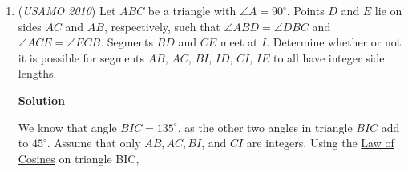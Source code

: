 \begin{enumerate}
 
 \begin{align*} A_{\omega,1}^2   &=     \frac{21}{10} \cdot \lim_{n \to \infty}       \prod_{k=2}^{n-1} 	\frac{(k+\frac{3}{4})(k-\frac{1}{2})(k-\frac{1}{4})} 	     {(k-\frac{3}{4})(k+\frac{1}{2})(k+\frac{1}{4})} \\   &=     \frac{21}{10} \cdot \lim_{n \to \infty}       \left(       \frac{\Gamma(\frac{5}{4})  \Gamma(\frac{5}{2})  \Gamma(\frac{9}{4})} 	   {\Gamma(\frac{11}{4}) \Gamma(\frac{3}{2})  \Gamma(\frac{7}{4})}\cdot       \frac{\Gamma(n+\frac{3}{4})\Gamma(n-\frac{1}{2})\Gamma(n-\frac{1}{4})} 	   {\Gamma(n-\frac{3}{4})\Gamma(n+\frac{1}{2})\Gamma(n+\frac{1}{4})}       \right) \\   &=     \frac{1}{4} \cdot \frac{\Gamma^2(\frac{1}{4})}{\Gamma^2(\frac{3}{4})} \cdot       \lim_{n \to \infty} 	\frac{\Gamma(n+\frac{3}{4})\Gamma(n-\frac{1}{2})\Gamma(n-\frac{1}{4})} 	     {\Gamma(n-\frac{3}{4})\Gamma(n+\frac{1}{2})\Gamma(n+\frac{1}{4})} \\   &= \frac{1}{4} \cdot \frac{\Gamma^2(\frac{1}{4})}{\Gamma^2(\frac{3}{4})}      \cdot 1 \quad \mbox{(Stirling's approximation)}\\   &= \frac{\Gamma^4(\frac{1}{4})}{8\pi^2}     = \frac{\pi}{\mathrm{AGM}^2(\sqrt{2}, 1)}     \approx 2.1884396152264766\ldots \end{align*}


 

 In summary, if we set $a_1 = \frac{\sqrt{\pi}}{\mathrm{AGM}(\sqrt{2}, 1)}$,and then recursively set $a_{i+1} = (2i + 1)/a_i$, we get an infinitesequence that, for all $n \ge 1$, yields the maximum possible product$a_1a_2\cdots a_{2n}$, subject to the conditions $a_ia_j \le i+j,\; 1 \le i < j \le 2n$.

 


	\item (\textit{USAMO 2010}) Let $ABC$ be a triangle with $\angle A=90^{\circ}$. Points $D$ and $E$ lie on sides $AC$ and $AB$, respectively, such that $\angle ABD=\angle DBC$ and $\angle ACE=\angle ECB$. Segments $BD$ and $CE$ meet at $I$. Determine whether or not it is possible for segments $AB$, $AC$, $BI$, $ID$, $CI$, $IE$ to all have integer side lengths.


 



\textbf{Solution}

We know that angle $BIC = 135^{\circ}$, as the other two angles in triangle $BIC$ add to $45^{\circ}$. Assume that only $AB, AC, BI$, and $CI$ are integers. Using the \href{https://artofproblemsolving.com/wiki/index.php?title=Law\_of\_Cosines}{Law of Cosines} on triangle BIC,


\end{enumerate}
